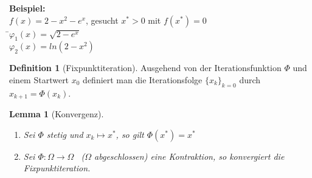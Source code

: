 \documentclass[10pt,a4paper]{article}
\newtheorem{lemma}{Lemma}[section]
\theoremstyle{definition} \newtheorem{definition}{Definition}[section]
\theoremstyle{bemerkung}    \newtheorem{bemerkung}{Bemerkung}[]
\begin{document}
\begin{tabbing}
\textbf{Beispiel:}
\\$f(x)=2-x^2-e^x$, gesucht $x^*>0$ mit $f(x^*)=0$\\
\hspace*{8mm} \=$\varphi_1(x)=\sqrt{2-e^x}$\\
\>$\varphi_2(x)=ln(2-x^2)$\\
\end{tabbing}

\begin{definition} [Fixpunktiteration]
Ausgehend von der Iterationsfunktion $\Phi$ und einem Startwert $x_0$ definiert man die Iterationsfolge $\{x_k\}_{k=0}$ durch $x_{k+1}=\Phi(x_k)$.\\
\end{definition}

\begin{lemma}[Konvergenz]
~ %
\begin{enumerate}
\item[a)] Sei $\Phi$ stetig und $x_k \longmapsto x^*$, so gilt $\Phi(x^*)=x^*$\\
\item[b)] Sei $\Phi: \Omega \longrightarrow \Omega$ \ ($\Omega$ abgeschlossen) eine Kontraktion, so konvergiert die Fixpunktiteration.
\end{enumerate}
\end{lemma}
\end{document}
